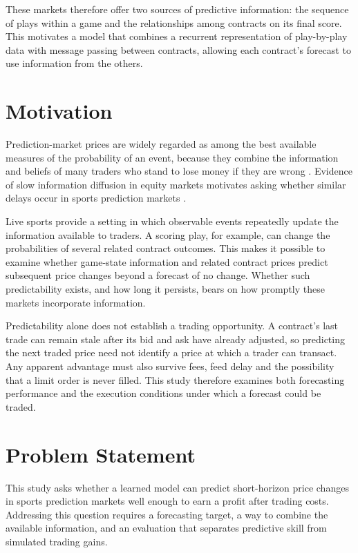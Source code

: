 \documentclass[12pt,a4paper,oneside]{report}
\begin{document}
These markets therefore offer two sources of predictive information: the sequence
of plays within a game and the relationships among contracts on its final score.
This motivates a model that combines a recurrent representation of play-by-play
data with message passing between contracts, allowing each contract's forecast to
use information from the others.

\section{Motivation}
Prediction-market prices are widely regarded as among the best available measures
of the probability of an event, because they combine the information and beliefs of
many traders who stand to lose money if they are wrong
\citep{wolfers2004prediction,arrow2008promise}. Evidence of slow information
diffusion in equity markets motivates asking whether similar delays occur in
sports prediction markets \citep{hong2000bad}.

Live sports provide a setting in which observable events repeatedly update the
information available to traders. A scoring play, for example, can change the
probabilities of several related contract outcomes. This makes it possible to
examine whether game-state information and related contract prices predict
subsequent price changes beyond a forecast of no change. Whether such
predictability exists, and how long it persists, bears on how promptly these
markets incorporate information.

Predictability alone does not establish a trading opportunity. A contract's last
trade can remain stale after its bid and ask have already adjusted, so predicting
the next traded price need not identify a price at which a trader can transact.
Any apparent advantage must also survive fees, feed delay and the possibility
that a limit order is never filled. This study therefore examines both forecasting
performance and the execution conditions under which a forecast could be traded.

\section{Problem Statement}
This study asks whether a learned model can predict short-horizon price
changes in sports prediction markets well enough to earn a profit after trading
costs. Addressing this question requires a forecasting target, a way to combine
the available information, and an evaluation that separates predictive skill
from simulated trading gains.
\end{document}
